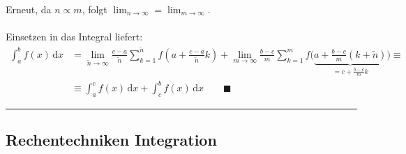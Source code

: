 \documentclass{article}
\newcommand{\diff}{\mathrm{d}}
\newcommand{\lr}[1]{\left(#1\right)}
\begin{document}
{	Erneut, da $n\propto m$, folgt $\lim_{n\to\infty} = \lim_{m\to\infty}$.\\
	\\
	Einsetzen in das Integral liefert:
		\begin{align*}
			\int_a^b f(x) \, \diff x &= \lim_{\tilde{n}\to\infty} \frac{c-a}{\tilde{n}} \sum_{k=1}^{\tilde{n}} f\lr{ a + \frac{c-a}{\tilde{n}}k } + \lim_{m\to\infty} \frac{b-c}{m} \sum_{k=1}^m f \Bigg( \underbrace{ a + \frac{b-c}{m}(k+\tilde{n}) }_{ = c + \frac{b-c}{m}k} \Bigg) \equiv \\
			&\equiv \int_a^c f(x) \, \diff x + \int_c^b f(x) \, \diff x \qquad \blacksquare
		\end{align*}
\hrule
}


\newpage


\subsection{Rechentechniken Integration}
\end{document}
